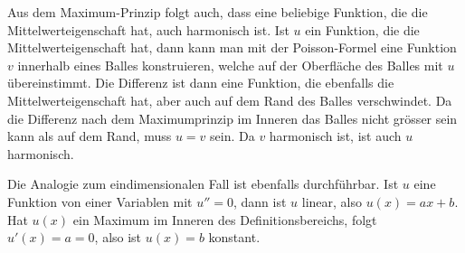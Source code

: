 Aus dem Maximum-Prinzip folgt auch, dass eine beliebige Funktion, die
die Mittelwerteigenschaft hat, auch harmonisch ist. Ist $u$ ein
Funktion, die die Mittelwerteigenschaft hat, dann kann man mit der
Poisson-Formel eine Funktion $v$ innerhalb eines Balles konstruieren,
welche auf der Oberfläche des Balles mit $u$ übereinstimmt.
Die Differenz ist dann eine Funktion, die ebenfalls die Mittelwerteigenschaft
hat, aber auch auf dem Rand des Balles verschwindet. Da die Differenz
nach dem Maximumprinzip
im Inneren das Balles nicht grösser sein kann als auf dem Rand,
muss $u=v$ sein. Da $v$ harmonisch ist, ist auch $u$ harmonisch.

Die Analogie zum eindimensionalen Fall ist ebenfalls durchführbar.
Ist $u$ eine Funktion von einer Variablen mit $u''=0$, dann ist
$u$ linear, also $u(x)=ax+b$. Hat $u(x)$ ein Maximum im Inneren
des Definitionsbereichs, folgt $u'(x)=a=0$, also ist $u(x)=b$ konstant.

